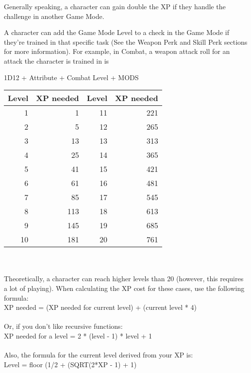 Generally speaking, a character can gain double the XP if they handle the challenge in another Game Mode.

A character can add the Game Mode Level to a check in the Game Mode if they're trained in that specific task (See the Weapon Perk and Skill Perk sections for more information). For example, in Combat, a weapon attack roll for an attack the character is trained in is \\
\begin{center}
	
1D12 + Attribute + Combat Level + MODS\\


\begin{tabular}{r r | r r}
Level & XP needed & Level & XP needed\\ \hline
1 & 1 & 11 & 221\\
2 & 5 & 12 & 265\\
3 & 13 & 13 & 313\\
4 & 25 & 14 & 365\\
5 & 41 & 15 & 421\\
6 & 61 & 16 & 481\\
7 & 85 & 17 & 545\\
8 & 113 & 18 & 613\\
9 & 145 & 19 & 685\\
10 & 181 & 20 & 761\\
\end{tabular}\\~\\

Theoretically, a character can reach higher levels than 20 (however, this requires a lot of playing). When calculating the XP cost for these cases, use the following formula:\\

XP needed = (XP needed for current level) + (current level * 4)\\~\\

Or, if you don't like recursive functions:\\
XP needed for a level = 2 * (level - 1) * level + 1\\~\\

Also, the formula for the current level derived from your XP is:\\

Level = floor (1/2 + (SQRT(2*XP - 1)  + 1)\\
\end{center}